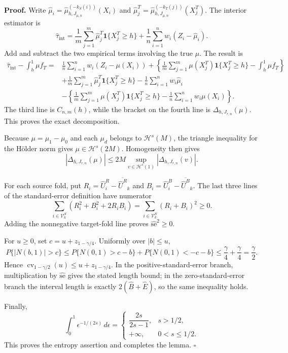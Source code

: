 \textbf{Proof.}
Write \(\widehat\mu_i=\widehat\mu_{h,J_{\mu,n}}^{(-k_S(i))}(X_i)\) and \(\widehat\mu_j^T=\widehat\mu_{h,J_{\mu,n}}^{(-k_T(j))}(X_j^T)\). The interior estimator is
\[
\widehat\tau_{\mathrm{int}}
=\frac1m\sum_{j=1}^m\widehat\mu_j^T\mathbf 1\{X_j^T\ge h\}
+\frac1n\sum_{i=1}^nw_i(Z_i-\widehat\mu_i).
\]
Add and subtract the two empirical terms involving the true \(\mu\). The result is
\[
\begin{aligned}
\widehat\tau_{\mathrm{int}}-\int_h^1\mu f_T
={}&\frac1n\sum_{i=1}^nw_i(Z_i-\mu(X_i))
+\left\{\frac1m\sum_{j=1}^m\mu(X_j^T)\mathbf 1\{X_j^T\ge h\}-\int_h^1\mu f_T\right\}\\
&+\frac1m\sum_{j=1}^m\widehat\mu_j^T\mathbf 1\{X_j^T\ge h\}
-\frac1n\sum_{i=1}^nw_i\widehat\mu_i\\
&-\left\{\frac1m\sum_{j=1}^m\mu(X_j^T)\mathbf 1\{X_j^T\ge h\}
-\frac1n\sum_{i=1}^nw_i\mu(X_i)\right\}.
\end{aligned}
\]
The third line is \(C_{n,m}(h)\), while the bracket on the fourth line is \(\Delta_{h,J_{r,n}}(\mu)\). This proves the exact decomposition.

Because \(\mu=\mu_1-\mu_0\) and each \(\mu_d\) belongs to \(\mathcal H^s(M)\), the triangle inequality for the Hölder norm gives \(\mu\in\mathcal H^s(2M)\). Homogeneity then gives
\[
|\Delta_{h,J_{r,n}}(\mu)|
\le2M\sup_{v\in\mathcal H^s(1)}|\Delta_{h,J_{r,n}}(v)|.
\]

For each source fold, put \(R_i=\widehat U^R_i-\overline{\widehat U^R}_k\) and \(B_i=\widehat U^B_i-\overline{\widehat U^B}_k\). The last three lines of the standard-error definition have numerator
\[
\sum_{i\in\mathcal V^S_k}(R_i^2+B_i^2+2R_iB_i)
=\sum_{i\in\mathcal V^S_k}(R_i+B_i)^2\ge0.
\]
Adding the nonnegative target-fold line proves \(\widehat{\mathrm{se}}^2\ge0\).

For \(u\ge0\), set \(c=u+z_{1-\gamma/4}\). Uniformly over \(|b|\le u\),
\[
P\{|N(b,1)|>c\}
\le P\{N(0,1)>c-b\}+P\{N(0,1)<-c-b\}
\le\frac\gamma4+\frac\gamma4=\frac\gamma2.
\]
Hence \(\operatorname{cv}_{1-\gamma/2}(u)\le u+z_{1-\gamma/4}\). In the positive-standard-error branch, multiplication by \(\widehat{\mathrm{se}}\) gives the stated length bound; in the zero-standard-error branch the interval length is exactly \(2(\widehat B+\widehat E)\), so the same inequality holds.

Finally,
\[
\int_0^1\epsilon^{-1/(2s)}\,d\epsilon
=\begin{cases}
\dfrac{2s}{2s-1},&s>1/2,\\
+\infty,&0<s\le1/2.
\end{cases}
\]
This proves the entropy assertion and completes the lemma. \(\square\)